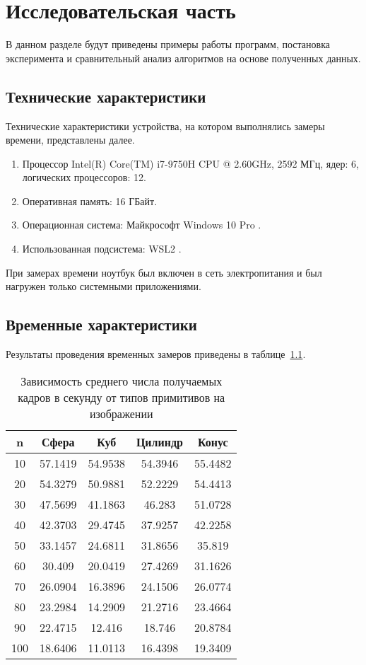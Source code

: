\chapter{Исследовательская часть}


В данном разделе будут приведены примеры работы программ, постановка эксперимента и сравнительный анализ алгоритмов на основе полученных данных.


\section{Технические характеристики}

Технические характеристики устройства, на котором выполнялись замеры времени, представлены далее.

\begin{enumerate}
	\item Процессор	Intel(R) Core(TM) i7-9750H CPU @ 2.60GHz, 2592 МГц, ядер: 6, логических процессоров: 12.
	\item Оперативная память: 16 ГБайт.
	\item Операционная система: Майкрософт Windows 10 Pro \cite{windows}.
	\item Использованная подсистема: WSL2 \cite{WSL2}.
\end{enumerate}

При замерах времени ноутбук был включен в сеть электропитания и был нагружен только системными приложениями.

\section{Временные характеристики}
Результаты проведения временных замеров приведены в таблице~\ref{t:timings}.


\begin{table}[ht]
	\centering
	\caption{Зависимость среднего числа получаемых кадров в секунду от типов примитивов на изображении}
	\begin{tabular}{|c|c|c|c|c|}
		\hline
		n   & Сфера   & Куб     & Цилиндр & Конус   \\ \hline
		10  & 57.1419 & 54.9538 & 54.3946 & 55.4482 \\ \hline
		20  & 54.3279 & 50.9881 & 52.2229 & 54.4413 \\ \hline
		30  & 47.5699 & 41.1863 & 46.283  & 51.0728 \\ \hline
		40  & 42.3703 & 29.4745 & 37.9257 & 42.2258 \\ \hline
		50  & 33.1457 & 24.6811 & 31.8656 & 35.819  \\ \hline
		60  & 30.409  & 20.0419 & 27.4269 & 31.1626 \\ \hline
		70  & 26.0904 & 16.3896 & 24.1506 & 26.0774 \\ \hline
		80  & 23.2984 & 14.2909 & 21.2716 & 23.4664 \\ \hline
		90  & 22.4715 & 12.416  & 18.746  & 20.8784 \\ \hline
		100 & 18.6406 & 11.0113 & 16.4398 & 19.3409 \\ \hline
	\end{tabular}
	\label{t:timings}
\end{table}

